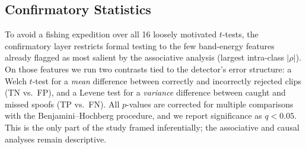 \documentclass[sigconf]{acmart}
\begin{document}
\subsection{Confirmatory Statistics}
To avoid a fishing expedition over all 16 loosely motivated $t$-tests, the
confirmatory layer restricts formal testing to the few band-energy features already
flagged as most salient by the associative analysis (largest intra-class $|\rho|$).
On those features
we run two contrasts tied
to the detector's error structure: a Welch $t$-test for a \emph{mean} difference
between correctly and incorrectly rejected clips (TN vs.\ FP), and a Levene test for
a \emph{variance} difference between caught and missed spoofs (TP vs.\ FN). All
$p$-values are corrected for multiple comparisons with the Benjamini--Hochberg
procedure, and we report significance as $q<0.05$. This is the only part of the
study framed inferentially; the associative and causal analyses remain descriptive.

\end{document}
